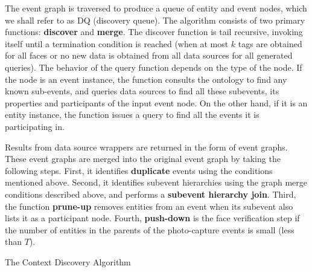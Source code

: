 The event graph is traversed to produce a queue of entity and event nodes, which we shall refer to as DQ (discovery queue). The algorithm consists of two primary functions: \textbf{discover} and \textbf{merge}. The discover function is tail recursive, invoking itself until a termination condition is reached (when at most $k$ tags are obtained for all faces or no new data is obtained from all data sources for all generated queries). The behavior of the query function depends on the type of the node. If the node is an event instance, the function consults the ontology to find any known sub-events, and queries data sources to find all these subevents, its properties and participants of the input event node. On the other hand, if it is an entity instance, the function issues a query to find all the events it is participating in. 

Results from data source wrappers are returned in the form of event graphs. These event graphs are merged into the original event graph by taking the following steps. First, it identifies \textbf{duplicate} events using the conditions mentioned above. Second, it identifies subevent hierarchies using the graph merge conditions described above, and performs a \textbf{subevent hierarchy join}. Third, the function \textbf{prune-up} removes entities from an event when its subevent also lists it as a participant node. Fourth, \textbf{push-down} is the face verification step if the number of entities in the parents of the photo-capture events is small (less than $T$). 

\SetAlgoSkip{}
\begin{algorithm}[h!]
\dontprintsemicolon 
{}
\caption{The Context Discovery Algorithm}
\label{alg:cx-alg}
\end{algorithm}

